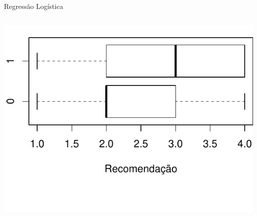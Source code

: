 \documentclass{beamer}\usepackage[]{graphicx}\usepackage[]{color}
\newenvironment{knitrout}{}{} %
\renewenvironment{knitrout}{\setlength{\topsep}{0mm}}{}
\begin{document}
\begin{frame}[fragile]{Regressão Logística}
\begin{columns}
\begin{knitrout}
\includegraphics[width=0.6\linewidth]{figure/logplot2-3} 

\end{knitrout}

\end{columns}

\end{frame}
\end{document}
